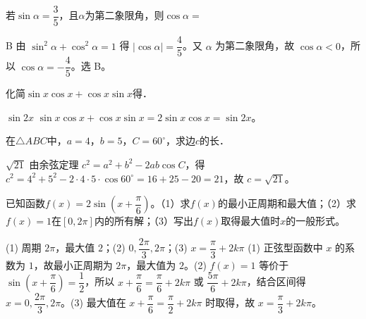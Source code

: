 \begin{question}[GPT生成]
若$\sin\alpha=\dfrac{3}{5}$，且$\alpha$为第二象限角，则$\cos\alpha=$\choiceBox
{}
\end{question}
\begin{answer}{B}
由 $\sin^2\alpha+\cos^2\alpha=1$ 得 $|\cos\alpha|=\dfrac45$。又 $\alpha$ 为第二象限角，故 $\cos\alpha<0$，所以 $\cos\alpha=-\dfrac45$。选 B。
\end{answer}

\begin{question}[GPT生成]
化简$\sin x\cos x+\cos x\sin x$得\blank{3cm}．
\end{question}
\begin{answer}{$\sin2x$}
$\sin x\cos x+\cos x\sin x=2\sin x\cos x=\sin2x$。
\end{answer}



\begin{question}[GPT生成]
在$\triangle ABC$中，$a=4$，$b=5$，$C=60^\circ$，求边$c$的长．
\end{question}
\begin{answer}{$\sqrt{21}$}
由余弦定理 $c^2=a^2+b^2-2ab\cos C$，得 $c^2=4^2+5^2-2\cdot4\cdot5\cdot\cos60^\circ=16+25-20=21$，故 $c=\sqrt{21}$。
\end{answer}



\begin{question}[GPT生成]
已知函数$f(x)=2\sin\left(x+\dfrac{\pi}{6}\right)$。（1）求$f(x)$的最小正周期和最大值；（2）求$f(x)=1$在$[0,2\pi]$内的所有解；（3）写出$f(x)$取得最大值时$x$的一般形式。
\end{question}
\solutionSpace{5cm}
\begin{answer}{(1) 周期 $2\pi$，最大值 $2$；(2) $0,\dfrac{2\pi}{3},2\pi$；(3) $x=\dfrac{\pi}{3}+2k\pi$}
(1) 正弦型函数中 $x$ 的系数为 $1$，故最小正周期为 $2\pi$，最大值为 $2$。(2) $f(x)=1$ 等价于 $\sin(x+\dfrac{\pi}{6})=\dfrac12$，所以 $x+\dfrac{\pi}{6}=\dfrac{\pi}{6}+2k\pi$ 或 $\dfrac{5\pi}{6}+2k\pi$，结合区间得 $x=0,\dfrac{2\pi}{3},2\pi$。(3) 最大值在 $x+\dfrac{\pi}{6}=\dfrac{\pi}{2}+2k\pi$ 时取得，故 $x=\dfrac{\pi}{3}+2k\pi$。
\end{answer}

